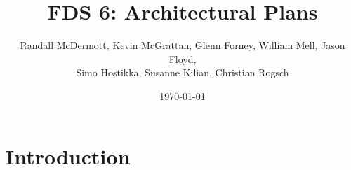 \documentclass[11pt]{article}
\begin{document}
\title{FDS 6: Architectural Plans}
\author{Randall McDermott\footnotemark[2], Kevin McGrattan, Glenn Forney, William Mell, Jason Floyd,\\Simo Hostikka, Susanne Kilian, Christian Rogsch}
\date{\today}
\maketitle
\thispagestyle{empty}

\section{Introduction}
\label{introduction}

%
%
\end{document}
